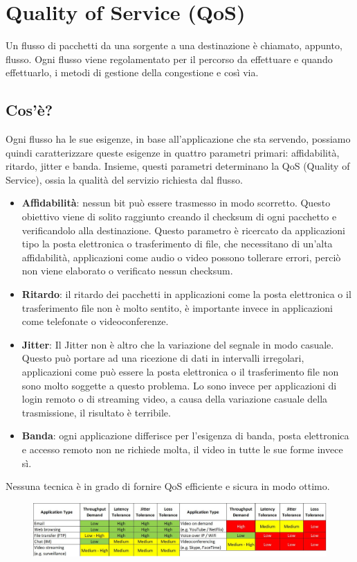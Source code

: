 \section{Quality of Service (QoS)}

Un flusso di pacchetti da una sorgente a una destinazione è chiamato, appunto, flusso.
Ogni flusso viene regolamentato per il percorso da effettuare e quando effettuarlo, i metodi di gestione della congestione e così via.
\subsection{Cos'è?}
Ogni flusso ha le sue esigenze, in base all’applicazione che sta servendo, possiamo quindi caratterizzare queste esigenze in quattro parametri primari: affidabilità, ritardo, jitter e banda. Insieme, questi parametri determinano la QoS (Quality of Service), ossia la qualità del servizio richiesta dal flusso.
\begin{itemize}
\item	\textbf{Affidabilità}: nessun bit può essere trasmesso in modo scorretto. Questo obiettivo viene di solito raggiunto creando il checksum di ogni pacchetto e verificandolo alla destinazione. Questo parametro è ricercato da applicazioni tipo la posta elettronica o trasferimento di file, che necessitano di un’alta affidabilità, applicazioni come audio o video possono tollerare errori, perciò non viene elaborato o verificato nessun checksum.
\item	\textbf{Ritardo}: il ritardo dei pacchetti in applicazioni come la posta elettronica o il trasferimento file non è molto sentito, è importante invece in applicazioni come telefonate o videoconferenze.
\item	\textbf{Jitter}: Il Jitter non è altro che la variazione del segnale in modo casuale. Questo può portare ad una ricezione di dati in intervalli irregolari, applicazioni come può essere la posta elettronica o il trasferimento file non sono molto soggette a questo problema. Lo sono invece per applicazioni di login remoto o di streaming video, a causa della variazione casuale della trasmissione, il risultato è terribile.
\item	\textbf{Banda}: ogni applicazione differisce per l’esigenza di banda, posta elettronica e accesso remoto non ne richiede molta, il video in tutte le sue forme invece sì.
\end{itemize}
Nessuna tecnica è in grado di fornire QoS efficiente e sicura in modo ottimo. 

\begin{figure}[H]
\centering
\includegraphics[scale=0.3]{res/img/40_QoS.png}
\end{figure}